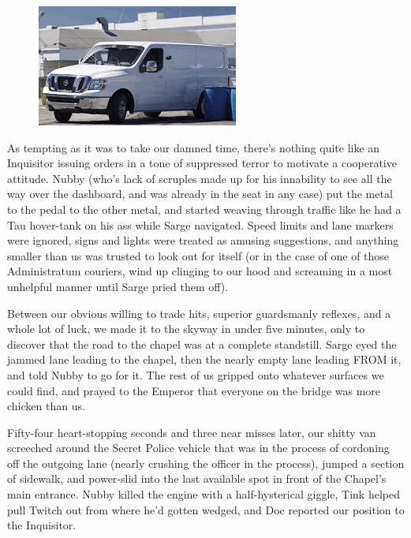 \begin{figure}
	\begin{center}
		\includegraphics[width=\figwidth]{pics/17/43.png}
	\end{center}
\end{figure}
As tempting as it was to take our damned time, there's nothing quite like an Inquisitor issuing orders in a tone of suppressed terror to motivate a cooperative attitude. 
Nubby (who's lack of scruples made up for his innability to see all the way over the dashboard, and was already in the seat in any case) put the metal to the pedal to the other metal, and started weaving through traffic like he had a Tau hover-tank on his ass while Sarge navigated. 
Speed limits and lane markers were ignored, signs and lights were treated as amusing suggestions, and anything smaller than us was trusted to look out for itself (or in the case of one of those Administratum couriers, wind up clinging to our hood and screaming in a most unhelpful manner until Sarge pried them off).

Between our obvious willing to trade hits, superior guardsmanly reflexes, and a whole lot of luck, we made it to the skyway in under five minutes, only to discover that the road to the chapel was at a complete standstill. 
Sarge eyed the jammed lane leading to the chapel, then the nearly empty lane leading FROM it, and told Nubby to go for it. 
The rest of us gripped onto whatever surfaces we could find, and prayed to the Emperor that everyone on the bridge was more chicken than us.

Fifty-four heart-stopping seconds and three near misses later, our shitty van screeched around the Secret Police vehicle that was in the process of cordoning off the outgoing lane (nearly crushing the officer in the process), jumped a section of sidewalk, and power-slid into the last available spot in front of the Chapel's main entrance. 
Nubby killed the engine with a half-hysterical giggle, Tink helped pull Twitch out from where he'd gotten wedged, and Doc reported our position to the Inquisitor.


